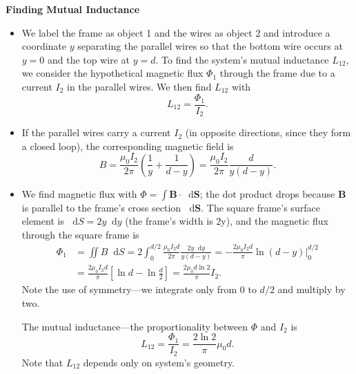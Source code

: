 \documentclass[11pt, a4paper]{article}
\newcommand{\diff}{\mathop{}\!\mathrm{d}} %
\renewcommand{\vec}[1]{\bm{#1}} %
\newcommand{\B}{\vec{B}}  %
\newcommand{\mm}{\mu_{0}}  %
\newcommand{\m}{\vec{m}}  %
\begin{document}
\vspace{2mm}
\textbf{Finding Mutual Inductance}
\begin{itemize}
	\item We label the frame as object 1 and the wires as object 2 and introduce a coordinate $ y $ separating the parallel wires so that the bottom wire occurs at $ y = 0 $ and the top wire at $ y = d $. To find the system's mutual inductance $ L_{12} $, we consider the hypothetical magnetic flux $ \Phi_{1} $ through the frame due to a current $ I_{2} $ in the parallel wires. We then find $ L_{12} $ with
	\begin{equation*}
		L_{12} = \frac{\Phi_{1}}{I_{2}}.
	\end{equation*}
	
	\item If the parallel wires carry a current $ I_{2} $ (in opposite directions, since they form a closed loop), the corresponding magnetic field is
	\begin{equation*}
		B = \frac{\mm I_{2}}{2\pi} \left(\frac{1}{y} + \frac{1}{d-y}\right) =  \frac{\mm I_{2}}{2\pi}  \frac{d}{y(d-y)}.
	\end{equation*}

	
	\item We find magnetic flux with $ \Phi = \int \B \cdot \diff \vec{S} $; the dot product drops because $ \B $ is parallel to the frame's cross section $ \diff \vec{S} $. The square frame's surface element is $ \diff S = 2y\diff y $ (the frame's width is 2y), and the magnetic flux through the square frame is
	\begin{align*}
		\Phi_{1} &= \iint B \diff S = 2\int_{0}^{d/2} \frac{\mm I_{2}d}{2\pi}  \frac{2y\diff y}{y(d-y)} = -\frac{2\mm I_{2}d}{\pi} \ln(d-y)\big |_{0}^{d/2}\\
		& =  \frac{2\mm I_{2}d}{\pi} \left[\ln d - \ln\frac{d}{2}\right] =  \frac{2\mm d \ln 2}{\pi}  I_{2}.
	\end{align*}
	Note the use of symmetry---we integrate only from $ 0 $ to $ d/2 $ and multiply by two.
	
	The mutual inductance---the proportionality between $ \Phi $ and $ I_{2} $ is 
	\begin{equation*}
		L_{12} = \frac{\Phi_{1}}{I_{2}} = \frac{2\ln 2}{\pi} \mm d.
	\end{equation*}
	Note that $ L_{12} $ depends only on system's geometry. 
\end{itemize}
\end{document}
